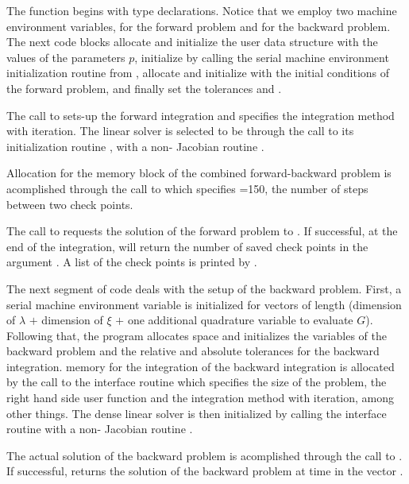 The  function begins with type declarations. Notice that we employ two machine 
environment variables,  for the forward problem and  for
the backward problem. The next code blocks allocate and initialize the user data
structure with the values of the parameters $p$, initialize  by calling
the serial machine environment initialization routine from {\nvecs}, allocate and
initialize  with the initial conditions of the forward problem, and finally
set the tolerances  and .

The call to  sets-up the forward integration and specifies the
 integration method with  iteration. The linear solver is
selected to be {\cvdense} through the call to its initialization routine
, with a non- Jacobian routine .

Allocation for the memory block of the combined forward-backward problem is
acomplished through the call to  which specifies =150,
the number of steps between two check points.

The call to  requests the solution of the forward problem to .
If successful, at the end of the integration,  will return the number
of saved check points in the argument . A list of the check points
is printed by .

The next segment of code deals with the setup of the backward problem. First,
a serial machine environment variable  is initialized for vectors
of length  (dimension of $\lambda$ $+$ dimension of $\xi$ $+$
one additional quadrature variable to evaluate $G$). Following that, the program 
allocates space and initializes the variables of the backward problem and
the relative and absolute tolerances for the backward integration.
{\cvodes} memory for the integration of the backward integration is allocated
by the call to the interface routine  which specifies the
size of the problem, the right hand side user function  and the 
integration method with  iteration, among other things.
The dense linear solver {\cvdense} is then initialized by calling the 
interface routine with a non- Jacobian routine .

The actual solution of the backward problem is acomplished through the call to
. If successful,  returns the solution of the backward 
problem at time  in the vector .

